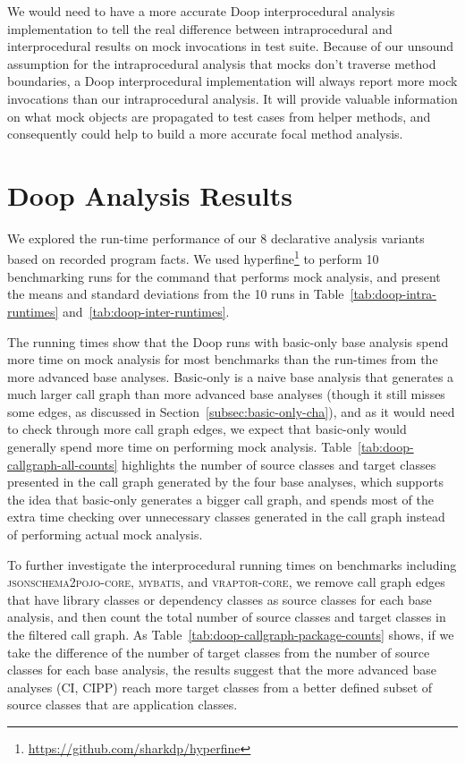 We would need to have a more accurate Doop interprocedural analysis implementation to tell the real difference between intraprocedural and interprocedural results on mock invocations in test suite. Because of our unsound assumption for the intraprocedural analysis that mocks don't traverse method boundaries, a Doop interprocedural implementation will always report more mock invocations than our intraprocedural analysis. It will provide valuable information on what mock objects are propagated to test cases from helper methods, and consequently could help to build a more accurate focal method analysis.

\section{Doop Analysis Results}

We explored the run-time performance of our 8 declarative analysis variants based on recorded program facts. We used hyperfine\footnote{\url{https://github.com/sharkdp/hyperfine}} to perform 10 benchmarking runs for the command that performs mock analysis, and present the means and standard deviations from the 10 runs in Table~\ref{tab:doop-intra-runtimes} and~\ref{tab:doop-inter-runtimes}.

The running times show that the Doop runs with basic-only base analysis spend more time on mock analysis for most benchmarks than the run-times from the more advanced base analyses. Basic-only is a naive base analysis that generates a much larger call graph than more advanced base analyses (though it still misses some edges, as discussed in Section~\ref{subsec:basic-only-cha}), and as it would need to check through more call graph edges, we expect that basic-only would generally spend more time on performing mock analysis. Table~\ref{tab:doop-callgraph-all-counts} highlights the number of source classes and target classes presented in the call graph generated by the four base analyses, which supports the idea that basic-only generates a bigger call graph, and spends most of the extra time checking over unnecessary classes generated in the call graph instead of performing actual mock analysis.

To further investigate the interprocedural running times on benchmarks including \textsc{jsonschema2pojo-core}, \textsc{mybatis}, and \textsc{vraptor-core}, we remove call graph edges that have library classes or dependency classes as source classes for each base analysis, and then count the total number of source classes and target classes in the filtered call graph. As Table~\ref{tab:doop-callgraph-package-counts} shows, if we take the difference of the number of target classes from the number of source classes for each base analysis, the results suggest that the more advanced base analyses (CI, CIPP) reach more target classes from a better defined subset of source classes that are application classes. 

